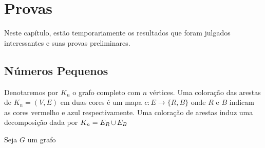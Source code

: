 
\chapter{Provas}

Neste capítulo, estão temporariamente os resultados que foram julgados interessantes e suas provas preliminares.\cite{alon}


\section{Números Pequenos}

Denotaremos por $K_n$ o grafo completo com $n$ vértices. Uma coloração das arestas de $K_n = (V,E)$ em duas cores é um mapa $c: E \to \{R,B\}$ onde $R$ e $B$ indicam as cores vermelho e azul respectivamente. Uma coloração de arestas induz uma decomposição dada por $K_n = E_R \operatorname{\cup} E_B$

\begin{definition}
Seja $G$ um grafo
\end{definition}

